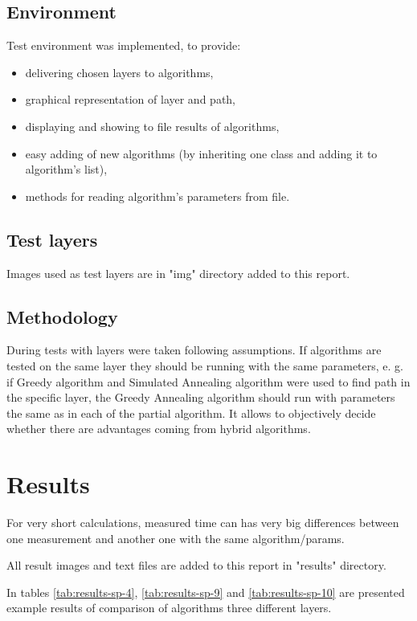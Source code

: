 \documentclass[titlepage]{article}
\begin{document}
\subsection{Environment}
Test environment was implemented, to provide:
\begin{itemize}
\item delivering chosen layers to algorithms,
\item graphical representation of layer and path,
\item displaying and showing to file results of algorithms,
\item easy adding of new algorithms (by inheriting one class and adding it to algorithm's list),
\item methods for reading algorithm's parameters from file.
\end{itemize}

\subsection{Test layers}
Images used as test layers are in "img" directory added to this report.

\subsection{Methodology}

During tests with layers were taken following assumptions. If algorithms are tested on the same layer they should be running with the same parameters, e. g. if Greedy algorithm and Simulated Annealing algorithm were used to find path in the specific layer, the Greedy Annealing algorithm should run with parameters the same as in each of the partial algorithm. It allows to objectively decide whether there are advantages coming from hybrid algorithms.

\section{Results}
For very short calculations, measured time can has very big differences between one measurement and another one with the same algorithm/params.

All result images and text files are added to this report in "results" directory.

In tables \ref{tab:results-sp-4}, \ref{tab:results-sp-9} and \ref{tab:results-sp-10} are presented example results of comparison of algorithms three different layers.
\end{document}
